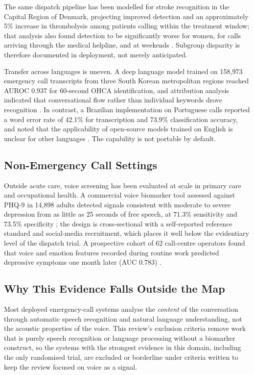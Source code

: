 \documentclass[11pt]{article}
\begin{document}
The same dispatch pipeline has been modelled for stroke recognition in the
Capital Region of Denmark, projecting improved detection and an approximately
5\% increase in thrombolysis among patients calling within the treatment window;
that analysis also found detection to be significantly worse for women, for
calls arriving through the medical helpline, and at weekends
\citep{scholz2022stroke}. Subgroup disparity is therefore documented in
deployment, not merely anticipated.

Transfer across languages is uneven. A deep language model trained on 158,973
emergency call transcripts from three South Korean metropolitan regions reached
AUROC 0.937 for 60-second OHCA identification, and attribution analysis
indicated that conversational flow rather than individual keywords drove
recognition \citep{choi2026dylm}. In contrast, a Brazilian implementation on
Portuguese calls reported a word error rate of 42.1\% for transcription and
73.9\% classification accuracy, and noted that the applicability of open-source
models trained on English is unclear for other languages
\citep{costa2023emergency}. The capability is not portable by default.

\subsection{Non-Emergency Call Settings}

Outside acute care, voice screening has been evaluated at scale in primary care
and occupational health. A commercial voice biomarker tool assessed against
PHQ-9 in 14,898 adults detected signals consistent with moderate to severe
depression from as little as 25 seconds of free speech, at 71.3\% sensitivity
and 73.5\% specificity \citep{mazur2025voice}; the design is cross-sectional
with a self-reported reference standard and social-media recruitment, which
places it well below the evidentiary level of the dispatch trial. A prospective
cohort of 62 call-centre operators found that voice and emotion features
recorded during routine work predicted depressive symptoms one month later
(AUC 0.783) \citep{tani2025callcentre}.

\subsection{Why This Evidence Falls Outside the Map}

Most deployed emergency-call systems analyse the \emph{content} of the
conversation through automatic speech recognition and natural language
understanding, not the acoustic properties of the voice. This review's
exclusion criteria remove work that is purely speech recognition or language
processing without a biomarker construct, so the systems with the strongest
evidence in this domain, including the only randomised trial, are excluded or
borderline under criteria written to keep the review focused on voice as a
signal.
\end{document}
